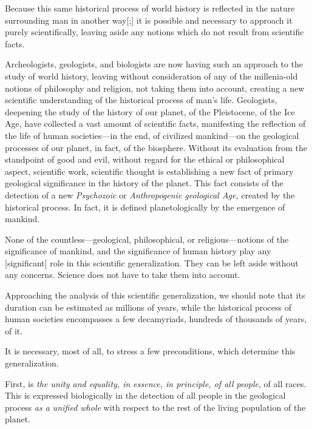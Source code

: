 \Section %
Because this same historical process of world history is reflected in the
nature surrounding man in another way[;] it is possible and necessary to approach it purely scientifically, leaving
aside any notions which do not result from scientific facts.

Archeologists, geologists, and biologists are now having such an approach to
the study of world history, leaving without consideration of any of the
millenia-old notions of philosophy and religion, not taking them into account,
creating a new scientific understanding of the historical process of man's
life.  Geologists, deepening the study of the history of our planet, of the
Pleistocene, of the Ice Age, have collected a vast amount of scientific facts,
manifesting the reflection of the life of human societies---in the end, of
civilized mankind---on the geological processes of our planet, in fact, of the
biosphere.  Without its evaluation from the standpoint of good and evil,
without regard for the ethical or philosophical aspect, scientific work,
scientific thought is establishing a new fact of primary geological
significance in the history of the planet.  This fact consists of the detection
of a new\emph{ Psychozoic }or\emph{ Anthropogenic geological Age, } created by
the historical process.  In fact, it is defined planetologically by the
emergence of mankind.

None of the countless---geological, philosophical, or religious---notions of the
significance of mankind, and the significance of human history play any
[significant] role in this scientific generalization.  They can be left aside
without any concerns.  Science does not have to take them into account.


\Section %
Approaching the analysis of this scientific generalization, we should note that
its duration can be estimated as millions of years, while the historical
process of human societies encompasses a few decamyriads, hundreds of thousands
of years, of it.

It is necessary, most of all, to stress a few preconditions, which determine
this generalization.

First, is \emph{the unity and equality, in essence, in principle, of all
people}, of all races.  This is expressed biologically in the detection of all
people in the geological process \emph{as a unified whole} with respect to the
rest of the living population of the planet.

